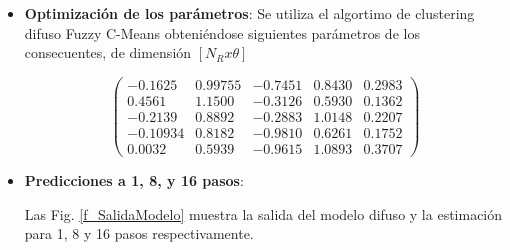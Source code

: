 \documentclass[12pt]{article}
\begin{document}
\begin{itemize}
\item \textbf{Optimización de los parámetros}: Se utiliza el algortimo de clustering difuso Fuzzy C-Means obteniéndose siguientes parámetros de los consecuentes, de dimensión $[N_Rx\theta]$

\begin{equation}
\left(
  \begin{array}{ccccc}
 -0.1625 &	0.99755	&-0.7451	&0.8430	 &0.2983\\
0.4561&	1.1500	& -0.3126	&0.5930	& 0.1362\\
-0.2139&	0.8892&	-0.2883&	1.0148&	0.2207\\
-0.10934&	0.8182&	-0.9810&	0.6261&	0.1752\\
0.0032&	0.5939&	-0.9615&	1.0893&	0.3707
  \end{array}
\right)
\label{e_ParaModDif}
\end{equation}

\item \textbf{Predicciones a 1, 8, y 16
pasos}:

Las Fig. \ref{f_SalidaModelo} muestra la salida del modelo difuso y  la estimación para 1, 8 y 16 pasos respectivamente.


\end{itemize}
\end{document}
